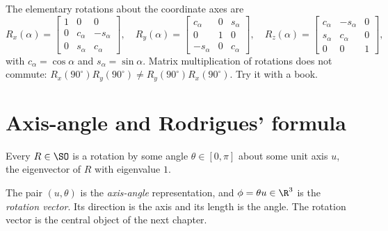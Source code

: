 The elementary rotations about the coordinate axes are
\begin{equation}
  R_x(\alpha) = \begin{bmatrix} 1 & 0 & 0 \\ 0 & c_\alpha & -s_\alpha \\ 0 & s_\alpha & c_\alpha \end{bmatrix},\quad
  R_y(\alpha) = \begin{bmatrix} c_\alpha & 0 & s_\alpha \\ 0 & 1 & 0 \\ -s_\alpha & 0 & c_\alpha \end{bmatrix},\quad
  R_z(\alpha) = \begin{bmatrix} c_\alpha & -s_\alpha & 0 \\ s_\alpha & c_\alpha & 0 \\ 0 & 0 & 1 \end{bmatrix},
\end{equation}
with $c_\alpha = \cos\alpha$ and $s_\alpha = \sin\alpha$. Matrix multiplication of rotations does not
commute: $R_x(90^\circ)R_y(90^\circ) \ne R_y(90^\circ)R_x(90^\circ)$. Try it with a book.

\section{Axis-angle and Rodrigues' formula}

\begin{theorem}
Every $R\in\SO$ is a rotation by some angle $\theta \in [0, \pi]$ about some unit axis $u$, the
eigenvector of $R$ with eigenvalue $1$.
\end{theorem}

The pair $(u, \theta)$ is the \emph{axis-angle} representation, and $\phi = \theta u \in \R^3$ is the
\emph{rotation vector}. Its direction is the axis and its length is the angle. The rotation vector is
the central object of the next chapter.

